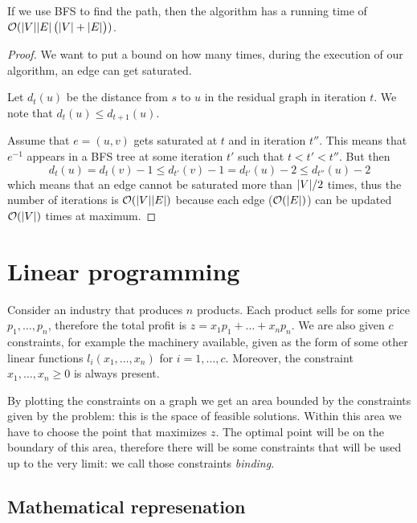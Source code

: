 \documentclass[12pt]{extarticle}
\begin{document}
\begin{theorem}
    If we use BFS to find the path, then the algorithm has a running time of $\mathcal{O}(\abs{V} \abs{E} \left( \abs{V} + \abs{E} \right))$.
\end{theorem}

\begin{proof}
    We want to put a bound on how many times, during the execution of our algorithm, an edge can get saturated.

    Let $d_t(u)$ be the distance from $s$ to $u$ in the residual graph in iteration $t$.
    We note that $d_t(u) \leq d_{t+1}(u)$.

    Assume that $e = (u, v)$ gets saturated at $t$ and in iteration $t''$.
    This means that $e^{-1}$ appears in a BFS tree at some iteration $t'$ such that $t < t' < t''$.
    But then
    \begin{equation}
        d_t(u) = d_t(v)-1 \leq d_{t'}(v)-1 = d_{t'}(u)-2 \leq d_{t''}(u)-2
    \end{equation}
    which means that an edge cannot be saturated more than $\abs{V}/2$ times,
    thus the number of iterations is $\mathcal{O}(\abs{V}\abs{E})$ because each edge ($\mathcal{O}(\abs{E})$) can be updated $\mathcal{O}(\abs{V})$ times at maximum.
\end{proof}

\section{Linear programming}

Consider an industry that produces $n$ products.
Each product sells for some price $p_1, \ldots, p_n$, therefore the total profit is $z = x_1 p_1 + \dots + x_n p_n$.
We are also given $c$ constraints, for example the machinery available, given as the form of some other linear functions $l_i(x_1, \ldots, x_n)$ for $i = 1, \ldots, c$.
Moreover, the constraint $x_1, \ldots, x_n \geq 0$ is always present.

By plotting the constraints on a graph we get an area bounded by the constraints given by the problem: this is the space of feasible solutions.
Within this area we have to choose the point that maximizes $z$.
The optimal point will be on the boundary of this area, therefore there will be some constraints that will be used up to the very limit: we call those  constraints \textit{binding}.

\subsection{Mathematical represenation}
\end{document}
